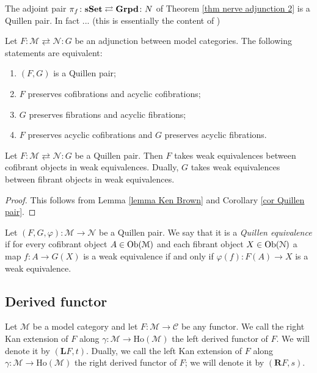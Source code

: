 \begin{refsection}
\begin{eg} \label{eg groupoids}
The adjoint pair $\pi_f \colon \mathbf{sSet} \rightleftarrows \mathbf{Grpd} \colon N$ of Theorem \ref{thm nerve adjunction 2} is a Quillen pair. In fact ... (this is essentially the content of \cite[Lemma 3.3]{hollander})
\end{eg}

\begin{cor} \label{cor Quillen pair}
Let $F \colon \mathcal M \rightleftarrows \mathcal N \colon G$ be an adjunction between model categories. The following statements are equivalent:
\begin{enumerate}
\item $(F,G)$ is a Quillen pair;
\item $F$ preserves cofibrations and acyclic cofibrations;
\item $G$ preserves fibrations and acyclic fibrations;
\item $F$ preserves acyclic cofibrations and $G$ preserves acyclic fibrations.
\end{enumerate}
\end{cor}

\begin{cor}
Let $F \colon \mathcal M \rightleftarrows \mathcal N \colon G$ be a Quillen pair. Then $F$ takes weak equivalences between cofibrant objects in weak equivalences. Dually, $G$ takes weak equivalences between fibrant objects in weak equivalences.
\end{cor}

\begin{proof}
This follows from Lemma \ref{lemma Ken Brown} and Corollary \ref{cor Quillen pair}.
\end{proof}

\begin{defin}
Let $(F,G,\varphi) \colon \mathcal M \to \mathcal N$ be a Quillen pair. We say that it is a \emph{Quillen equivalence} if for every cofibrant object $A \in \operatorname{Ob}(\mathcal M)$ and each fibrant object $X \in \operatorname{Ob}(\mathcal N)$ a map $f \colon A \to G(X)$ is a weak equivalence if and only if $\varphi(f) \colon F(A) \to X$ is a weak equivalence.
\end{defin}



\subsection{Derived functor}

\begin{defin}
Let $\mathcal M$ be a model category and let $F \colon \mathcal M \to \mathcal C$ be any functor. We call the right Kan extension of $F$ along $\gamma \colon \mathcal M \to \text{Ho}(\mathcal M)$ the left derived functor of $F$. We will denote it by $(\mathbf LF,t)$. Dually, we call the left Kan extension of $F$ along $\gamma \colon \mathcal M \to \text{Ho}(\mathcal M)$ the right derived functor of $F$; we will denote it by $(\mathbf RF,s)$.
\end{defin}


\end{refsection}

